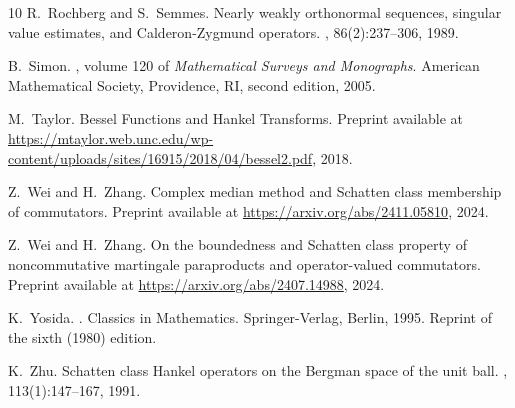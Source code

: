 \documentclass[12pt]{amsart}
\begin{document}
\begin{thebibliography}{10}
R.~Rochberg and S.~Semmes.
\newblock Nearly weakly orthonormal sequences, singular value estimates, and
  {C}alderon-{Z}ygmund operators.
, 86(2):237--306, 1989.


{\color{blue}B.~Simon.
, volume 120 of {\em
  Mathematical Surveys and Monographs}.
\newblock American Mathematical Society, Providence, RI, second edition, 2005.}

M.~Taylor.
\newblock Bessel {F}unctions and {H}ankel {T}ransforms.
\newblock Preprint available at
  \url{https://mtaylor.web.unc.edu/wp-content/uploads/sites/16915/2018/04/bessel2.pdf},
  2018.

Z.~Wei and H.~Zhang.
\newblock Complex median method and {S}chatten class membership of commutators.
\newblock Preprint available at \url{https://arxiv.org/abs/2411.05810}, 2024.

Z.~Wei and H.~Zhang.
\newblock On the boundedness and {S}chatten class property of noncommutative
  martingale paraproducts and operator-valued commutators.
\newblock Preprint available at \url{https://arxiv.org/abs/2407.14988}, 2024.



K.~Yosida.
.
\newblock Classics in Mathematics. Springer-Verlag, Berlin, 1995.
\newblock Reprint of the sixth (1980) edition.

K.~Zhu.
\newblock Schatten class {H}ankel operators on the {B}ergman space of the unit
  ball.
, 113(1):147--167, 1991.

\end{thebibliography}
\end{document}
